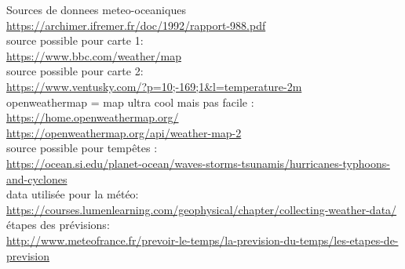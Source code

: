 \documentclass[12pt]{report}
\begin{document}

\begin{thebibliography}{9}

    Sources de donnees meteo-oceaniques\\
    \url{https://archimer.ifremer.fr/doc/1992/rapport-988.pdf}\\

    source possible pour carte 1:\\
    \url{https://www.bbc.com/weather/map }    \\

    source possible pour carte 2:\\
    \url{https://www.ventusky.com/?p=10;-169;1&l=temperature-2m} \\

    openweathermap = map ultra cool mais pas facile :\\
    \url{https://home.openweathermap.org/} \\
    \url{https://openweathermap.org/api/weather-map-2}\\

    source possible pour tempêtes :\\
    \url{https://ocean.si.edu/planet-ocean/waves-storms-tsunamis/hurricanes-typhoons-and-cyclones}\\

    data utilisée pour la météo:\\
    \url{https://courses.lumenlearning.com/geophysical/chapter/collecting-weather-data/}\\


    étapes des prévisions:\\
    \url{http://www.meteofrance.fr/prevoir-le-temps/la-prevision-du-temps/les-etapes-de-prevision}\\

\end{thebibliography}
\end{document}
